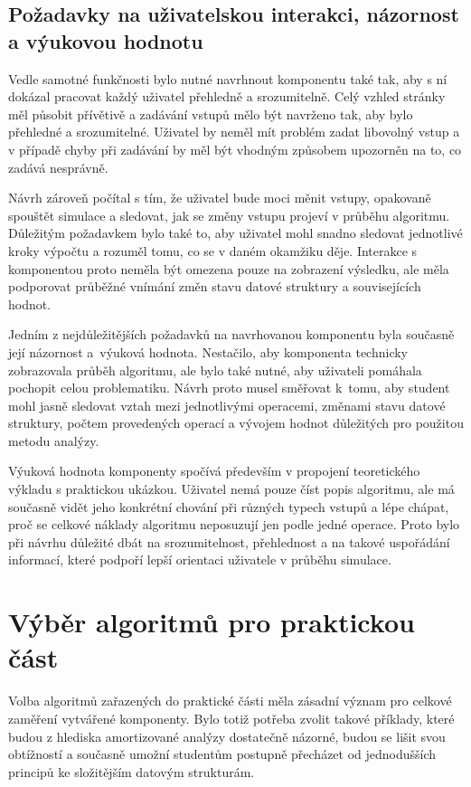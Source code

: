 \subsection{Požadavky na uživatelskou interakci, názornost a výukovou hodnotu}
Vedle samotné funkčnosti bylo nutné navrhnout komponentu také tak, aby s ní dokázal pracovat každý uživatel přehledně a srozumitelně. Celý vzhled stránky měl působit přívětivě a zadávání vstupů mělo být navrženo tak, aby bylo přehledné a srozumitelné. Uživatel by neměl mít problém zadat libovolný vstup a v případě chyby při zadávání by měl být vhodným způsobem upozorněn na to, co zadává nesprávně.

Návrh zároveň počítal s tím, že uživatel bude moci měnit vstupy, opakovaně spouštět simulace a sledovat, jak se změny vstupu projeví v průběhu algoritmu. Důležitým požadavkem bylo také to, aby uživatel mohl snadno sledovat jednotlivé kroky výpočtu a rozuměl tomu, co se v daném okamžiku děje. Interakce s komponentou proto neměla být omezena pouze na zobrazení výsledku, ale měla podporovat průběžné vnímání změn stavu datové struktury a souvisejících hodnot.

Jedním z nejdůležitějších požadavků na navrhovanou komponentu byla současně její názornost a~výuková hodnota. Nestačilo, aby komponenta technicky zobrazovala průběh algoritmu, ale bylo také nutné, aby uživateli pomáhala pochopit celou problematiku. Návrh proto musel směřovat k~tomu, aby student mohl jasně sledovat vztah mezi jednotlivými operacemi, změnami stavu datové struktury, počtem provedených operací a vývojem hodnot důležitých pro použitou metodu analýzy.

Výuková hodnota komponenty spočívá především v propojení teoretického výkladu s praktickou ukázkou. Uživatel nemá pouze číst popis algoritmu, ale má současně vidět jeho konkrétní chování při různých typech vstupů a lépe chápat, proč se celkové náklady algoritmu neposuzují jen podle jedné operace. Proto bylo při návrhu důležité dbát na srozumitelnost, přehlednost a na takové uspořádání informací, které podpoří lepší orientaci uživatele v průběhu simulace.


\section{Výběr algoritmů pro praktickou část}
Volba algoritmů zařazených do praktické části měla zásadní význam pro celkové zaměření vytvářené komponenty. Bylo totiž potřeba zvolit takové příklady, které budou z hlediska amortizované analýzy dostatečně názorné, budou se lišit svou obtížností a současně umožní studentům postupně přecházet od jednodušších principů ke složitějším datovým strukturám.
\newpage

